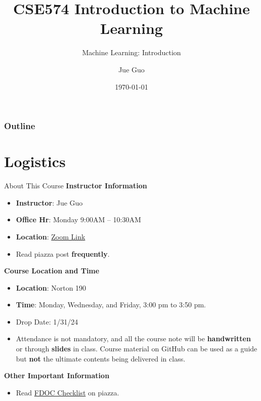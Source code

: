 \documentclass[10pt,dvipsnames]{beamer}
\title{CSE574 Introduction to Machine Learning}
\subtitle{Machine Learning: Introduction}
\author{Jue Guo}
\institute{University at Buffalo}
\date{\today}
\begin{document}
\begin{frame}
    \titlepage
\end{frame}

\begin{frame}
    \frametitle{Outline}
    \tableofcontents
\end{frame}
\section{Logistics}
\begin{frame}{About This Course}
    \textbf{Instructor Information}
    \begin{itemize}
        \item \textbf{Instructor}: Jue Guo
        \item \textbf{Office Hr}: Monday 9:00AM -- 10:30AM
        \item \textbf{Location}: \href{https://buffalo.zoom.us/j/7673733717?pwd=TktTVXlDOGgxM3dRUC9UT21hNEdOQT09&omn=92002344719}{Zoom Link}
        \item Read piazza post \textbf{frequently}.
    \end{itemize}
    \textbf{Course Location and Time}
    \begin{itemize}
        \item \textbf{Location}: Norton 190
        \item \textbf{Time}: Monday, Wednesday, and Friday, 3:00 pm to 3:50 pm.
        \item Drop Date: 1/31/24
        \item Attendance is not mandatory, and all the course note will be \textbf{handwritten} or through \textbf{slides} in class. Course material on GitHub can be used as a guide but \textbf{not} the ultimate contents being delivered in class.
    \end{itemize}
    \textbf{Other Important Information}
    \begin{itemize}
        \item Read \href{https://piazza.com/class/lq6pes9vr0v135/post/20}{FDOC Checklist} on piazza.
    \end{itemize}

\end{frame}
\end{document}

